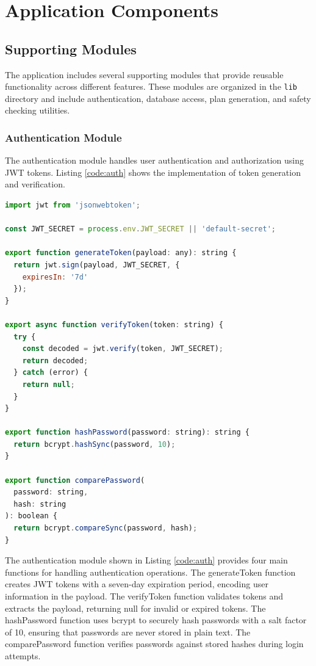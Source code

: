 \section{Application Components}

\subsection{Supporting Modules}

The application includes several supporting modules that provide reusable functionality across different features. These modules are organized in the \texttt{lib} directory and include authentication, database access, plan generation, and safety checking utilities.

\subsubsection{Authentication Module}

The authentication module handles user authentication and authorization using JWT tokens. Listing \ref{code:auth} shows the implementation of token generation and verification.

\begin{lstlisting}[language=JavaScript, caption=Authentication Module Implementation, label=code:auth]
import jwt from 'jsonwebtoken';

const JWT_SECRET = process.env.JWT_SECRET || 'default-secret';

export function generateToken(payload: any): string {
  return jwt.sign(payload, JWT_SECRET, {
    expiresIn: '7d'
  });
}

export async function verifyToken(token: string) {
  try {
    const decoded = jwt.verify(token, JWT_SECRET);
    return decoded;
  } catch (error) {
    return null;
  }
}

export function hashPassword(password: string): string {
  return bcrypt.hashSync(password, 10);
}

export function comparePassword(
  password: string, 
  hash: string
): boolean {
  return bcrypt.compareSync(password, hash);
}
\end{lstlisting}

The authentication module shown in Listing \ref{code:auth} provides four main functions for handling authentication operations. The generateToken function creates JWT tokens with a seven-day expiration period, encoding user information in the payload. The verifyToken function validates tokens and extracts the payload, returning null for invalid or expired tokens. The hashPassword function uses bcrypt to securely hash passwords with a salt factor of 10, ensuring that passwords are never stored in plain text. The comparePassword function verifies passwords against stored hashes during login attempts.

